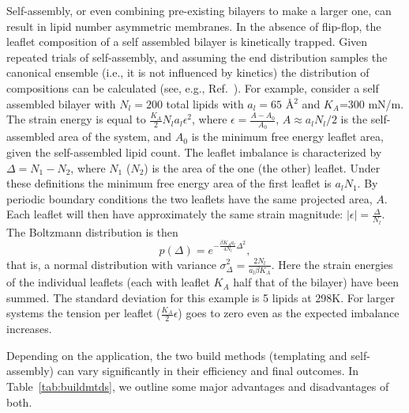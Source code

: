 \documentclass[9pt,bestpractices]{livecoms}
\begin{document}
Self-assembly, or even combining pre-existing bilayers to make a larger one, can result in lipid number asymmetric membranes.
In the absence of flip-flop, the leaflet composition of a self assembled bilayer is kinetically trapped.
Given repeated trials of self-assembly, and assuming the end distribution samples the canonical ensemble (i.e., it is not influenced by kinetics) the distribution of compositions can be calculated (see, e.g., Ref.~\cite{Park2015a}).
For example, consider a self assembled bilayer with $N_l=200$ total lipids with $a_l=65$ \AA$^2$ and $K_A$=300 mN/m.
The strain energy is equal to $\frac{K_A}{2} N_l a_l \epsilon^2$, where $\epsilon=\frac{A-A_0}{A_0}$, $A \approx a_l N_l / 2$ is the self-assembled area of the system, and $A_0$ is the minimum free energy leaflet area, given the self-assembled lipid count. 
The leaflet imbalance is characterized by $\Delta = N_\textrm{1} - N_\textrm{2}$, where $N_{1}$ ($N_2$) is the area of the one (the other) leaflet.
Under these definitions the minimum free energy area of the first leaflet is $a_l N_1$.
By periodic boundary conditions the two leaflets have the same projected area, $A$.
Each leaflet will then have approximately the same strain magnitude: $|\epsilon| = \frac{\Delta}{N_l}$.   
The Boltzmann distribution is then
\begin{equation}
p(\Delta) = e^{-\frac{\beta K_A a_l }{4 N_l} \Delta^2}, 
\end{equation}
that is, a normal distribution with variance $\sigma_\Delta^2 = \frac{2 N_l}{a_l \beta K_A}$.
Here the strain energies of the individual leaflets (each with leaflet $K_A$ half that of the bilayer) have been summed.
The standard deviation for this example is 5 lipids at 298K. 
For larger systems the tension per leaflet ($\frac{K_A}{2} \epsilon$) goes to zero even as the expected imbalance increases.

Depending on the application, the two build methods (templating and self-assembly) can vary significantly in their efficiency and final outcomes.
In Table~\ref{tab:buildmtds}, we outline some major advantages and disadvantages of both.
\end{document}

